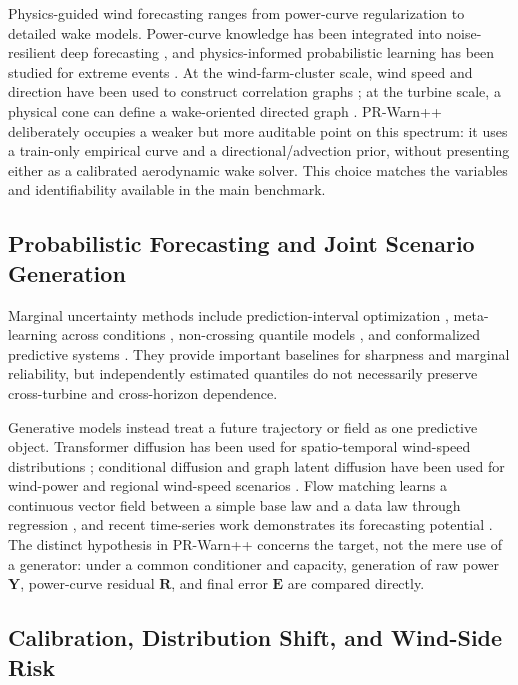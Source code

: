 \documentclass[journal]{IEEEtran}
\begin{document}
Physics-guided wind forecasting ranges from power-curve regularization to detailed wake models. Power-curve knowledge has been integrated into noise-resilient deep forecasting \cite{gao2025tgdpF}, and physics-informed probabilistic learning has been studied for extreme events \cite{liu2024physicsrl}. At the wind-farm-cluster scale, wind speed and direction have been used to construct correlation graphs \cite{wang2025clustergraph}; at the turbine scale, a physical cone can define a wake-oriented directed graph \cite{hou2026wake}. PR-Warn++ deliberately occupies a weaker but more auditable point on this spectrum: it uses a train-only empirical curve and a directional/advection prior, without presenting either as a calibrated aerodynamic wake solver. This choice matches the variables and identifiability available in the main benchmark.

\subsection{Probabilistic Forecasting and Joint Scenario Generation}

Marginal uncertainty methods include prediction-interval optimization \cite{chen2024interval}, meta-learning across conditions \cite{meng2024meta}, non-crossing quantile models \cite{chen2025noncrossing}, and conformalized predictive systems \cite{jonkers2024conformal}. They provide important baselines for sharpness and marginal reliability, but independently estimated quantiles do not necessarily preserve cross-turbine and cross-horizon dependence.

Generative models instead treat a future trajectory or field as one predictive object. Transformer diffusion has been used for spatio-temporal wind-speed distributions \cite{liu2026diffusion}; conditional diffusion and graph latent diffusion have been used for wind-power and regional wind-speed scenarios \cite{gao2026diffusion,ma2026stgld}. Flow matching learns a continuous vector field between a simple base law and a data law through regression \cite{lipman2023fm}, and recent time-series work demonstrates its forecasting potential \cite{kollovieh2025tsflow}. The distinct hypothesis in PR-Warn++ concerns the target, not the mere use of a generator: under a common conditioner and capacity, generation of raw power $\bm Y$, power-curve residual $\bm R$, and final error $\bm E$ are compared directly.

\subsection{Calibration, Distribution Shift, and Wind-Side Risk}
\end{document}
